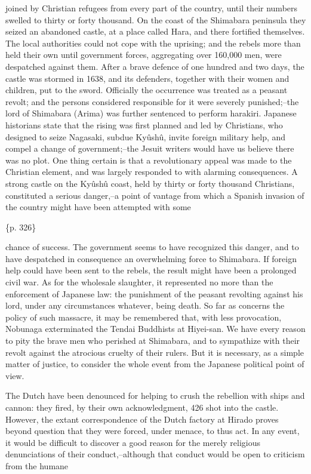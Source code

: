 joined by Christian refugees from every part of the country, until their numbers swelled to thirty or forty thousand. On the coast of the Shimabara peninsula they seized an abandoned castle, at a place called Hara, and there fortified themselves. The local authorities could not cope with the uprising; and the rebels more than held their own until government forces, aggregating over 160,000 men, were despatched against them. After a brave defence of one hundred and two days, the castle was stormed in 1638, and its defenders, together with their women and children, put to the sword. Officially the occurrence was treated as a peasant revolt; and the persons considered responsible for it were severely punished;--the lord of Shimabara (Arima) was further sentenced to perform harakiri. Japanese historians state that the rising was first planned and led by Christians, who designed to seize Nagasaki, subdue Kyûshû, invite foreign military help, and compel a change of government;--the Jesuit writers would have us believe there was no plot. One thing certain is that a revolutionary appeal was made to the Christian element, and was largely responded to with alarming consequences. A strong castle on the Kyûshû coast, held by thirty or forty thousand Christians, constituted a serious danger,--a point of vantage from which a Spanish invasion of the country might have been attempted with some

\{p. 326\}

chance of success. The government seems to have recognized this danger, and to have despatched in consequence an overwhelming force to Shimabara. If foreign help could have been sent to the rebels, the result might have been a prolonged civil war. As for the wholesale slaughter, it represented no more than the enforcement of Japanese law: the punishment of the peasant revolting against his lord, under any circumstances whatever, being death. So far as concerns the policy of such massacre, it may be remembered that, with less provocation, Nobunaga exterminated the Tendai Buddhists at Hiyei-san. We have every reason to pity the brave men who perished at Shimabara, and to sympathize with their revolt against the atrocious cruelty of their rulers. But it is necessary, as a simple matter of justice, to consider the whole event from the Japanese political point of view.

The Dutch have been denounced for helping to crush the rebellion with ships and cannon: they fired, by their own acknowledgment, 426 shot into the castle. However, the extant correspondence of the Dutch factory at Hirado proves beyond question that they were forced, under menace, to thus act. In any event, it would be difficult to discover a good reason for the merely religious denunciations of their conduct,--although that conduct would be open to criticism from the humane

